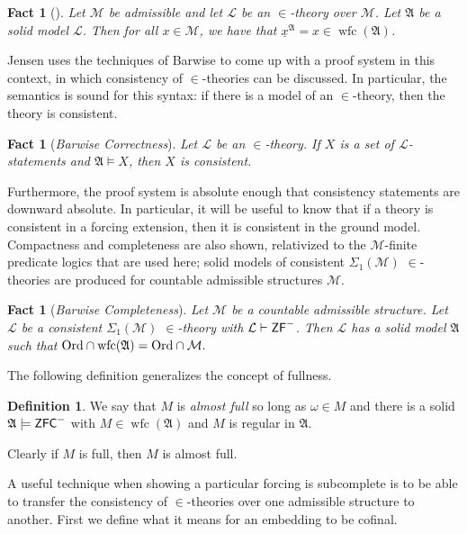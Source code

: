 \documentclass{amsart}
\newtheorem{fact}[theorem]{Fact}
\theoremstyle{definition}
\newtheorem{definition}[theorem]{Definition}
\theoremstyle{remark}
\newcommand{\M}{\mathcal{M}}
\newcommand{\ZFC}{\textup{\ensuremath{\textsf{ZFC}}}}
\newcommand{\Ord}{\textup{\ensuremath{\text{Ord}}}}
\DeclareMathOperator{\wfc}{wfc}
\begin{document}
\begin{fact}[{\cite[Ch.~2, Lemma 9]{Jensen:2014}}] \label{fact:PointofBasicAxioms} Let $\M$ be admissible and let $\mathcal L$ be an $\in$-theory over $\M$. Let $\mathfrak A$ be a solid model $\mathcal L$. Then for all $x \in \M$, we have that $\underline{x}^{\mathfrak A} = x \in \wfc(\mathfrak A)$. \end{fact}

Jensen uses the techniques of Barwise to come up with a proof system in this context, in which consistency of $\in$-theories can be discussed. In particular, the semantics is sound for this syntax: if there is a model of an \(\in\)-theory, then the theory is consistent. 
\begin{fact}[\emph{Barwise Correctness}] \label{fact:correctness} 
Let $\mathcal L$ be an $\in$-theory. If $X$ is a set of $\mathcal L$-statements and $\mathfrak A \models X$, then $X$ is consistent. \end{fact}

Furthermore, the proof system is absolute enough that consistency statements are downward absolute. In particular, it will be useful to know that if a theory is consistent in a forcing extension, then it is consistent in the ground model. Compactness and completeness are also shown, relativized to the $\M$-finite predicate logics that are used here; solid models of consistent $\Sigma_1(\M)$ $\in$-theories are produced for countable admissible structures $\M$. 

\begin{fact}[\emph{Barwise Completeness}] \label{fact:completeness} Let $\M$ be a countable admissible structure. Let $\mathcal L$ be a consistent $\Sigma_1(\M)$ $\in$-theory with $\mathcal L \vdash \textsf{\textup{ZF}}^-$. Then $\mathcal L$ has a solid model $\mathfrak A$ such that $\Ord \cap \wfc(\mathfrak A) = \Ord \cap \M.$ \end{fact}

The following definition generalizes the concept of fullness.
\begin{definition} We say that $M$ is \emph{almost full} so long as $\omega \in M$ and there is a solid $\mathfrak A \models \ZFC^-$ with $M \in \wfc(\mathfrak A)$ and $M$ is regular in $\mathfrak A$. \end{definition}
Clearly if $M$ is full, then $M$ is almost full.

A useful technique when showing a particular forcing is subcomplete is to be able to transfer the consistency of $\in$-theories over one admissible structure to another. First we define what it means for an embedding to be cofinal.
\end{document}
